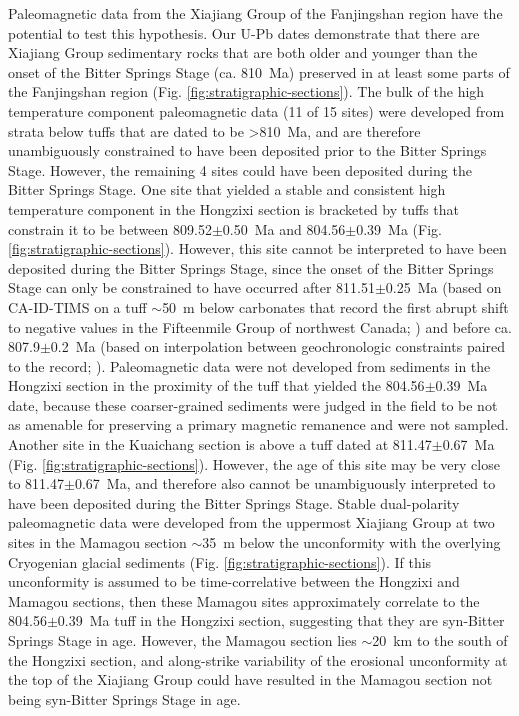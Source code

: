 Paleomagnetic data from the Xiajiang Group of the Fanjingshan region have the potential to test this hypothesis. Our U-Pb dates demonstrate that there are Xiajiang Group sedimentary rocks that are both older and younger than the onset of the Bitter Springs Stage (ca. 810~Ma) preserved in at least some parts of the Fanjingshan region (Fig. \ref{fig:stratigraphic-sections}). The bulk of the high temperature component paleomagnetic data (11 of 15 sites) were developed from strata below tuffs that are dated to be \textgreater 810~Ma, and are therefore unambiguously constrained to have been deposited prior to the Bitter Springs Stage. However, the remaining 4 sites could have been deposited during the Bitter Springs Stage. One site that yielded a stable and consistent high temperature component in the Hongzixi section is bracketed by tuffs that constrain it to be between 809.52$\pm$0.50~Ma and 804.56$\pm$0.39~Ma (Fig. \ref{fig:stratigraphic-sections}). However, this site cannot be interpreted to have been deposited during the Bitter Springs Stage, since the onset of the Bitter Springs Stage can only be constrained to have occurred after 811.51$\pm$0.25~Ma (based on CA-ID-TIMS on a tuff $\sim$50~m below carbonates that record the first abrupt shift to negative \dC values in the Fifteenmile Group of northwest Canada; \citealp{Macdonald2010a}) and before ca. 807.9$\pm$0.2~Ma (based on interpolation between geochronologic constraints paired to the \dC record; \citealp{Swanson-Hysell2015a}). Paleomagnetic data were not developed from sediments in the Hongzixi section in the proximity of the tuff that yielded the 804.56$\pm$0.39~Ma date, because these coarser-grained sediments were judged in the field to be not as amenable for preserving a primary magnetic remanence and were not sampled. Another site in the Kuaichang section is above a tuff dated at 811.47$\pm$0.67~Ma (Fig. \ref{fig:stratigraphic-sections}). However, the age of this site may be very close to 811.47$\pm$0.67~Ma, and therefore also cannot be unambiguously interpreted to have been deposited during the Bitter Springs Stage. Stable dual-polarity paleomagnetic data were developed from the uppermost Xiajiang Group at two sites in the Mamagou section $\sim$35~m below the unconformity with the overlying Cryogenian glacial sediments (Fig. \ref{fig:stratigraphic-sections}). If this unconformity is assumed to be time-correlative between the Hongzixi and Mamagou sections, then these Mamagou sites approximately correlate to the 804.56$\pm$0.39~Ma tuff in the Hongzixi section, suggesting that they are syn-Bitter Springs Stage in age. However, the Mamagou section lies $\sim$20~km to the south of the Hongzixi section, and along-strike variability of the erosional unconformity at the top of the Xiajiang Group could have resulted in the Mamagou section not being syn-Bitter Springs Stage in age.

